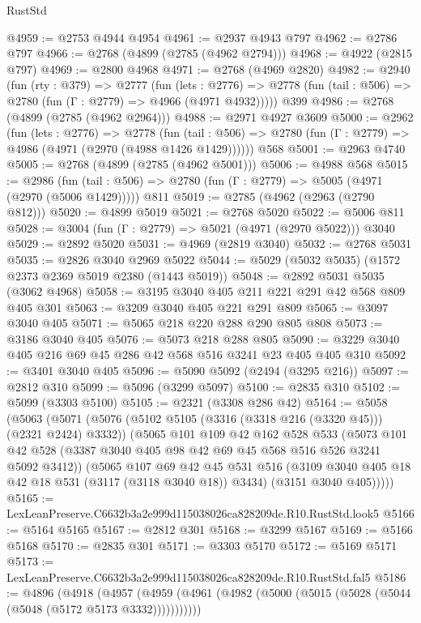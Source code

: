 \begin{lexlean}{RustStd}
\begin{coremodule}
@4959 := @2753 @4944 @4954
@4961 := @2937 @4943 @797
@4962 := @2786 @797
@4966 := @2768 (@4899 (@2785 (@4962 @2794)))
@4968 := @4922 (@2815 @797)
@4969 := @2800 @4968
@4971 := @2768 (@4969 @2820)
@4982 := @2940
    (fun (rty : @379) =>
    @2777
      (fun (lets : @2776) =>
      @2778 (fun (tail : @506) => @2780 (fun (Γ : @2779) => @4966 (@4971 @4932)))))
    @399
@4986 := @2768 (@4899 (@2785 (@4962 @2964)))
@4988 := @2971 @4927 @3609
@5000 := @2962
    (fun (lets : @2776) =>
    @2778
      (fun (tail : @506) => @2780 (fun (Γ : @2779) => @4986 (@4971 (@2970 (@4988 @1426 @1429))))))
    @568
@5001 := @2963 @4740
@5005 := @2768 (@4899 (@2785 (@4962 @5001)))
@5006 := @4988 @568
@5015 := @2986
    (fun (tail : @506) => @2780 (fun (Γ : @2779) => @5005 (@4971 (@2970 (@5006 @1429)))))
    @811
@5019 := @2785 (@4962 (@2963 (@2790 @812)))
@5020 := @4899 @5019
@5021 := @2768 @5020
@5022 := @5006 @811
@5028 := @3004 (fun (Γ : @2779) => @5021 (@4971 (@2970 @5022))) @3040
@5029 := @2892 @5020
@5031 := @4969 (@2819 @3040)
@5032 := @2768 @5031
@5035 := @2826 @3040 @2969 @5022
@5044 := @5029 (@5032 @5035) (@1572 @2373 @2369 @5019 @2380 (@1443 @5019))
@5048 := @2892 @5031 @5035 (@3062 @4968)
@5058 := @3195 @3040 @405 @211 @221 @291 @42 @568 @809 @405 @301
@5063 := @3209 @3040 @405 @221 @291 @809
@5065 := @3097 @3040 @405
@5071 := @5065 @218 @220 @288 @290 @805 @808
@5073 := @3186 @3040 @405
@5076 := @5073 @218 @288 @805
@5090 := @3229 @3040 @405 @216 @69 @45 @286 @42 @568 @516 @3241 @23 @405 @405 @310
@5092 := @3401 @3040 @405
@5096 := @5090 @5092 (@2494 (@3295 @216))
@5097 := @2812 @310
@5099 := @5096 (@3299 @5097)
@5100 := @2835 @310
@5102 := @5099 (@3303 @5100)
@5105 := @2321 (@3308 @286 @42)
@5164 := @5058
    (@5063
      (@5071
        (@5076 (@5102 @5105 (@3316 (@3318 @216 (@3320 @45))) (@2321 @2424) @3332))
        (@5065
          @101
          @109
          @42
          @162
          @528
          @533
          (@5073 @101 @42 @528 (@3387 @3040 @405 @98 @42 @69 @45 @568 @516 @526 @3241 @5092 @3412))
          (@5065
            @107
            @69
            @42
            @45
            @531
            @516
            (@3109 @3040 @405 @18 @42 @18 @531 (@3117 (@3118 @3040 @18)) @3434)
            (@3151 @3040 @405)))))
@5165 := LexLeanPreserve.C6632b3a2e999d115038026ca828209de.R10.RustStd.look5
@5166 := @5164 @5165
@5167 := @2812 @301
@5168 := @3299 @5167
@5169 := @5166 @5168
@5170 := @2835 @301
@5171 := @3303 @5170
@5172 := @5169 @5171
@5173 := LexLeanPreserve.C6632b3a2e999d115038026ca828209de.R10.RustStd.fal5
@5186 := @4896
    (@4918
      (@4957 (@4959 (@4961 (@4982 (@5000 (@5015 (@5028 (@5044 (@5048 (@5172 @5173 @3332)))))))))))

\end{coremodule}
\end{lexlean}
